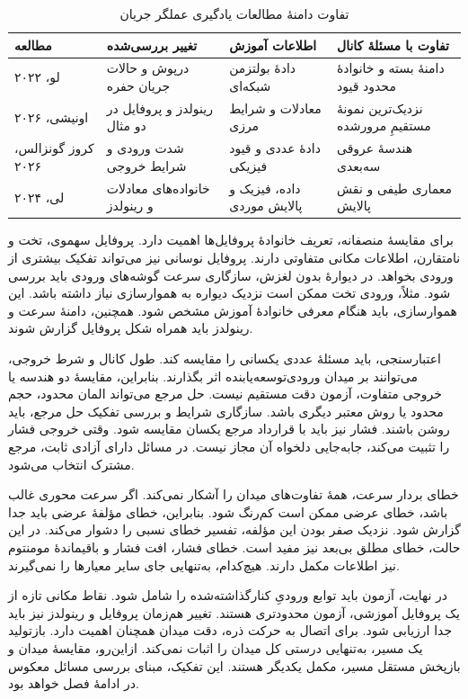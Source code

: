 \begin{table}[htbp]
\centering
\caption{تفاوت دامنهٔ مطالعات یادگیری عملگر جریان}
\label{tab:lit-variable-inlet-studies}
\begin{tabular}{p{}p{}p{}p{}}
\hline
مطالعه & تغییر بررسی‌شده & اطلاعات آموزش & تفاوت با مسئلهٔ کانال \\
\hline
لو، ۲۰۲۲ & درپوش و حالات جریان حفره & دادهٔ بولتزمن شبکه‌ای & دامنهٔ بسته و خانوادهٔ محدود قیود \\
اونیشی، ۲۰۲۶ & رینولدز و پروفایل در دو مثال & معادلات و شرایط مرزی & نزدیک‌ترین نمونهٔ مستقیمِ مرورشده \\
کروز گونزالس، ۲۰۲۶ & شدت ورودی و شرایط خروجی & دادهٔ عددی و قیود فیزیکی & هندسهٔ عروقی سه‌بعدی \\
لی، ۲۰۲۴ & خانواده‌های معادلات و رینولدز & داده، فیزیک و پالایش موردی & معماری طیفی و نقش پالایش \\
\hline
\end{tabular}
\end{table}

برای مقایسهٔ منصفانه، تعریف خانوادهٔ پروفایل‌ها اهمیت دارد.
پروفایل سهموی، تخت و نامتقارن، اطلاعات مکانی متفاوتی دارند.
پروفایل نوسانی نیز می‌تواند تفکیک بیشتری از ورودی بخواهد.
در دیوارهٔ بدون لغزش، سازگاری سرعت گوشه‌های ورودی باید بررسی شود.
مثلاً، ورودی تخت ممکن است نزدیک دیواره به هموارسازی نیاز داشته باشد.
این هموارسازی، باید هنگام معرفی خانوادهٔ آموزش مشخص شود.
همچنین، دامنهٔ سرعت و رینولدز باید همراه شکل پروفایل گزارش شوند.

اعتبارسنجی، باید مسئلهٔ عددی یکسانی را مقایسه کند.
طول کانال و شرط خروجی، می‌توانند بر میدان ورودی‌توسعه‌یابنده اثر بگذارند.
بنابراین، مقایسهٔ دو هندسه یا خروجی متفاوت، آزمون دقت مستقیم نیست.
حل مرجع می‌تواند المان محدود، حجم محدود یا روش معتبر دیگری باشد.
سازگاری شرایط و بررسی تفکیک حل مرجع، باید روشن باشند.
فشار نیز باید با قرارداد مرجع یکسان مقایسه شود.
وقتی خروجی فشار را تثبیت می‌کند، جابه‌جایی دلخواه آن مجاز نیست.
در مسائل دارای آزادی ثابت، مرجع مشترک انتخاب می‌شود.

خطای بردار سرعت، همهٔ تفاوت‌های میدان را آشکار نمی‌کند.
اگر سرعت محوری غالب باشد، خطای عرضی ممکن است کم‌رنگ شود.
بنابراین، خطای مؤلفهٔ عرضی باید جدا گزارش شود.
نزدیک صفر بودن این مؤلفه، تفسیر خطای نسبی را دشوار می‌کند.
در این حالت، خطای مطلق بی‌بعد نیز مفید است.
خطای فشار، افت فشار و باقیماندهٔ مومنتوم نیز اطلاعات مکمل دارند.
هیچ‌کدام، به‌تنهایی جای سایر معیارها را نمی‌گیرند.

در نهایت، آزمون باید توابع ورودیِ کنارگذاشته‌شده را شامل شود.
نقاط مکانی تازه از یک پروفایل آموزشی، آزمون محدودتری هستند.
تغییر هم‌زمان پروفایل و رینولدز نیز باید جدا ارزیابی شود.
برای اتصال به حرکت ذره، دقت میدان همچنان اهمیت دارد.
بازتولید یک مسیر، به‌تنهایی درستی کل میدان را اثبات نمی‌کند.
ازاین‌رو، مقایسهٔ میدان و بازپخش مستقل مسیر، مکمل یکدیگر هستند.
این تفکیک، مبنای بررسی مسائل معکوس در ادامهٔ فصل خواهد بود.

